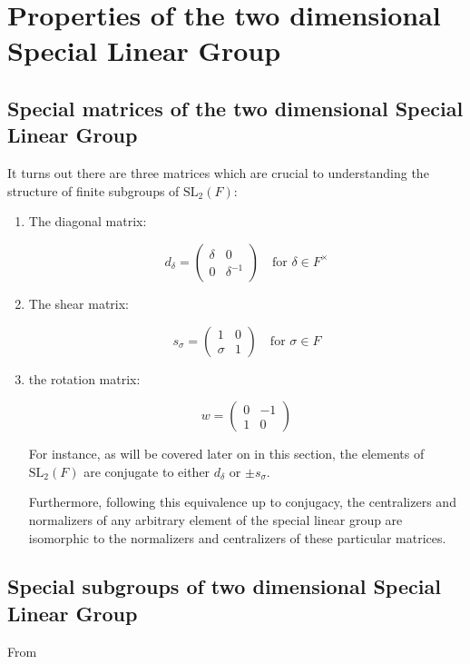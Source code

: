 \chapter{Properties of the two dimensional Special Linear Group}\label{Ch3_PropertiesOfSLOverAlgClosedField}

\section{Special matrices of the two dimensional Special Linear Group}

It turns out there are three matrices which are crucial to understanding the structure of finite subgroups of $\textrm{SL}_2(F)$:

\begin{enumerate}
    \item The diagonal matrix:

    \begin{equation}
        d_\delta = \begin{pmatrix}
            \delta & 0\\
            0 & \delta^{-1}
        \end{pmatrix} \quad \text{for $\delta \in F^\times$}
    \end{equation}

    \item The shear matrix:

    \begin{equation}
        s_\sigma = \begin{pmatrix}
            1 & 0\\
            \sigma & 1
        \end{pmatrix} \quad \text{for $\sigma \in F$}
    \end{equation}

    \item the rotation matrix: 

    \begin{equation}
        w = \begin{pmatrix}
            0 & -1\\
            1 & 0
        \end{pmatrix}
    \end{equation}

    For instance, as will be covered later on in this section, the elements of $\textrm{SL}_2(F)$ are conjugate to either $d_\delta$ or $\pm s_\sigma$.

    Furthermore, following this equivalence up to conjugacy, the centralizers and normalizers of any arbitrary element of the special linear group are isomorphic to the normalizers and centralizers of these particular matrices.
    
\end{enumerate}


\section{Special subgroups of two dimensional Special Linear Group}

From  